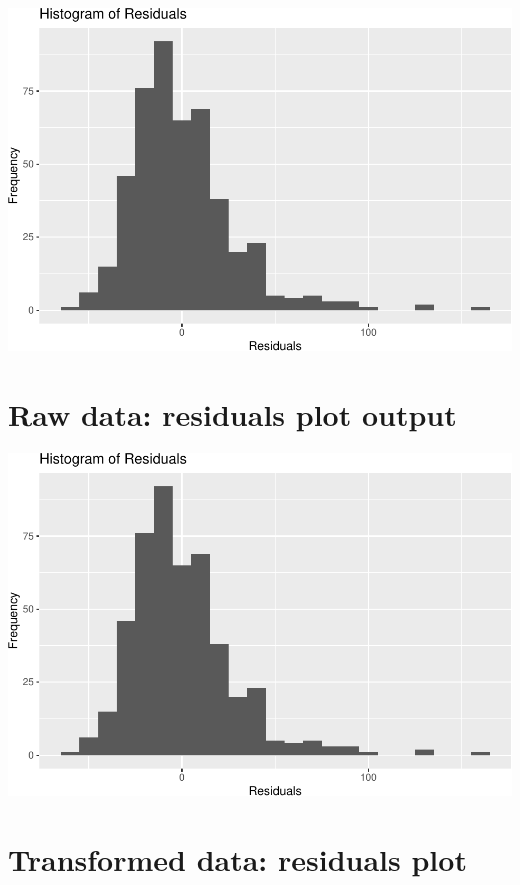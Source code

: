 \documentclass[
]{article}
\begin{document}
\includegraphics{L8_Correlation_and_regression_pdf_files/figure-latex/unnamed-chunk-10-1.pdf}

\hypertarget{raw-data-residuals-plot-output}{%
\section{Raw data: residuals plot
output}\label{raw-data-residuals-plot-output}}

\includegraphics{L8_Correlation_and_regression_pdf_files/figure-latex/unnamed-chunk-11-1.pdf}

\hypertarget{transformed-data-residuals-plot}{%
\section{Transformed data: residuals
plot}\label{transformed-data-residuals-plot}}
\end{document}
